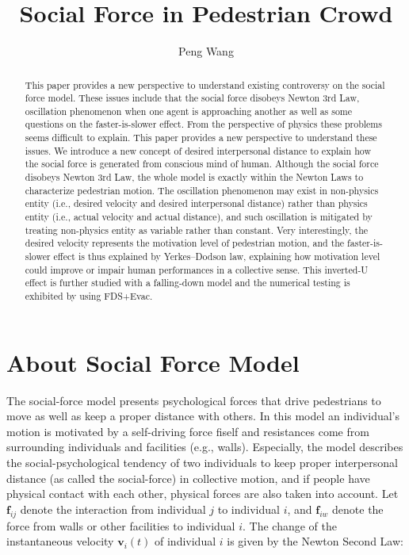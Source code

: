 \documentclass{article}
\begin{document}
\usepackage{graphicx}

\title{Social Force in Pedestrian Crowd}
\author{Peng Wang}%


\maketitle

\begin{abstract}
This paper provides a new perspective to understand existing controversy on the social force model.  These issues include that the social force disobeys Newton 3rd Law, oscillation phenomenon when one agent is approaching another as well as some questions on the faster-is-slower effect.  From the perspective of physics these problems seems difficult to explain.  This paper provides a new perspective to understand these issues.  We introduce a new concept of desired interpersonal distance to explain how the social force is generated from conscious mind of human.  Although the social force disobeys Newton 3rd Law, the whole model is exactly within the Newton Laws to characterize pedestrian motion.  The oscillation phenomenon may exist in non-physics entity (i.e., desired velocity and desired interpersonal distance) rather than physics entity (i.e., actual velocity and actual distance), and such oscillation is mitigated by treating non-physics entity as variable rather than constant.  Very interestingly, the desired velocity represents the motivation level of pedestrian motion, and the faster-is-slower effect is thus explained by Yerkes–Dodson law, explaining how motivation level could improve or impair human performances in a collective sense.  This inverted-U effect is further studied with a falling-down model and the numerical testing is exhibited by using FDS+Evac.
\end{abstract}


\section{About Social Force Model}

The social-force model presents psychological forces that drive pedestrians to move as well as keep a proper distance with others.  In this model an individual's motion is motivated by a self-driving force fiself and resistances come from surrounding individuals and facilities (e.g., walls).  Especially, the model describes the social-psychological tendency of two individuals to keep proper interpersonal distance (as called the social-force) in collective motion, and if people have physical contact with each other, physical forces are also taken into account.  Let $\mathbf{f}_{ij}$ denote the interaction from individual $j$ to individual $i$, and $\mathbf{f}_{iw}$ denote the force from walls or other facilities to individual $i$.  The change of the instantaneous velocity $\mathbf{v}_i(t)$ of individual $i$ is given by the Newton Second Law:
\end{document}

